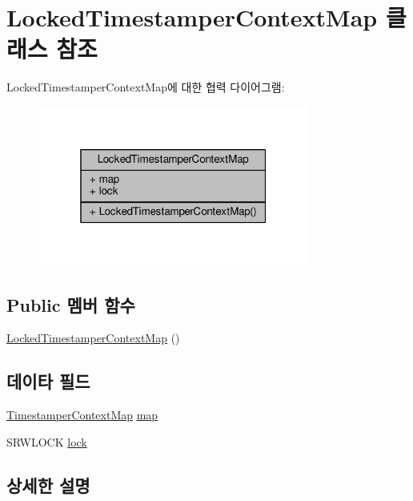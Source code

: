 \hypertarget{class_locked_timestamper_context_map}{}\section{Locked\+Timestamper\+Context\+Map 클래스 참조}
\label{class_locked_timestamper_context_map}


Locked\+Timestamper\+Context\+Map에 대한 협력 다이어그램\+:
\nopagebreak
\begin{figure}[H]
\begin{center}
\leavevmode
\includegraphics[width=253pt]{class_locked_timestamper_context_map__coll__graph}
\end{center}
\end{figure}
\subsection*{Public 멤버 함수}
\begin{DoxyCompactItemize}
\item 
\hyperlink{class_locked_timestamper_context_map_a2ac435a63c2d58bba4c878fb967efa1a}{Locked\+Timestamper\+Context\+Map} ()
\end{DoxyCompactItemize}
\subsection*{데이타 필드}
\begin{DoxyCompactItemize}
\item 
\hyperlink{intel__wireless_8cpp_a0f9a719dabae98e7a59c9fc215d113c3}{Timestamper\+Context\+Map} \hyperlink{class_locked_timestamper_context_map_a8880e18111e491249278c4cebf453b97}{map}
\item 
S\+R\+W\+L\+O\+CK \hyperlink{class_locked_timestamper_context_map_afed18a2dbad108768defb51810a7a760}{lock}
\end{DoxyCompactItemize}


\subsection{상세한 설명}


